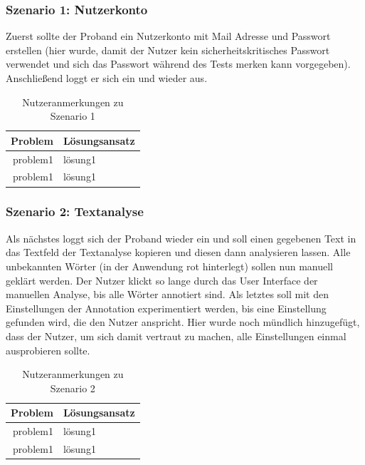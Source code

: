 \subsubsection{Szenario 1: Nutzerkonto}

Zuerst sollte der Proband ein Nutzerkonto mit Mail Adresse und Passwort erstellen (hier wurde, damit der Nutzer kein sicherheitskritisches Passwort verwendet und sich das Passwort während des Tests merken kann  vorgegeben). Anschließend loggt er sich ein und wieder aus.


\begin{table}[h!]
	\centering
	\begin{tabular}{|r|l|}
		\hline
		\textbf{Problem} & \textbf{Lösungsansatz}\\
		\hline
		\hline
		problem1 & lösung1\\
		\hline
		problem1 & lösung1\\
		\hline
	\end{tabular}
	\caption{Nutzeranmerkungen zu Szenario 1}
	\label{table:szenario1}
\end{table}

\subsubsection{Szenario 2: Textanalyse}

Als nächstes loggt sich der Proband wieder ein und soll einen gegebenen Text in das Textfeld der Textanalyse kopieren und diesen dann analysieren lassen. Alle unbekannten Wörter (in der Anwendung rot hinterlegt) sollen nun manuell geklärt werden. Der Nutzer klickt so lange durch das User Interface der manuellen Analyse, bis alle Wörter annotiert sind. Als letztes soll mit den Einstellungen der Annotation experimentiert werden, bis eine Einstellung gefunden wird, die den Nutzer anspricht. Hier wurde noch mündlich hinzugefügt, dass der Nutzer, um sich damit vertraut zu machen, alle Einstellungen einmal ausprobieren sollte.


\begin{table}[h!]
	\centering
	\begin{tabular}{|r|l|}
		\hline
		\textbf{Problem} & \textbf{Lösungsansatz}\\
		\hline
		\hline
		problem1 & lösung1\\
		\hline
		problem1 & lösung1\\
		\hline
	\end{tabular}
	\caption{Nutzeranmerkungen zu Szenario 2}
	\label{table:szenario2}
\end{table}

